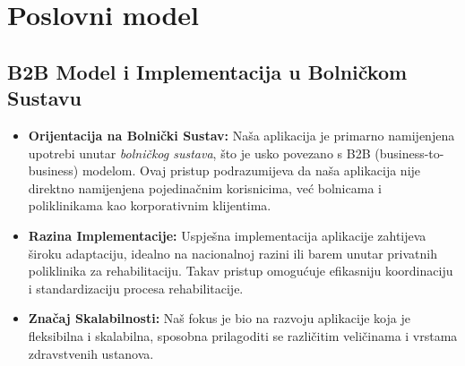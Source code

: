         \eject
        
        

        \section*{Poslovni model}
        
        \subsection*{B2B Model i Implementacija u Bolničkom Sustavu}
        \begin{itemize}
            \item \textbf{Orijentacija na Bolnički Sustav:} Naša aplikacija je primarno namijenjena upotrebi unutar \textit{bolničkog sustava}, što je usko povezano s B2B (business-to-business) modelom. Ovaj pristup podrazumijeva da naša aplikacija nije direktno namijenjena pojedinačnim korisnicima, već bolnicama i poliklinikama kao korporativnim klijentima.
            
            \item \textbf{Razina Implementacije:} Uspješna implementacija aplikacije zahtijeva široku adaptaciju, idealno na nacionalnoj razini ili barem unutar privatnih poliklinika za rehabilitaciju. Takav pristup omogućuje efikasniju koordinaciju i standardizaciju procesa rehabilitacije.
            
            \item \textbf{Značaj Skalabilnosti:} Naš fokus je bio na razvoju aplikacije koja je fleksibilna i skalabilna, sposobna prilagoditi se različitim veličinama i vrstama zdravstvenih ustanova.
        \end{itemize}
        
